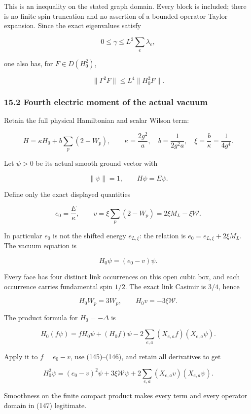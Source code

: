\documentclass[
  11pt,
]{article}
\begin{document}
This is an inequality on the stated graph domain. Every block is
included; there is no finite spin truncation and no assertion of a
bounded-operator Taylor expansion. Since the exact eigenvalues satisfy

\[
 0\le\gamma\le L^2\sum_e\lambda_e,
\]

one also has, for \(F\in D(H_0^2)\),

\[
 \|\Gamma^2F\|\le L^4\|H_0^2F\|.
\tag{144}
\]

\subsubsection{15.2 Fourth electric moment of the actual
vacuum}\label{fourth-electric-moment-of-the-actual-vacuum}

Retain the full physical Hamiltonian and scalar Wilson term:

\[
 H=\kappa H_0+b\sum_p(2-W_p),\qquad
 \kappa=\frac{2g^2}{a},\quad b=\frac1{2g^2a},\quad
 \xi=\frac b\kappa=\frac1{4g^4}.
\]

Let \(\psi>0\) be its actual smooth ground vector with

\[
 \|\psi\|=1,\qquad H\psi=E\psi.
\]

Define only the exact displayed quantities

\[
 e_0=\frac E\kappa,\qquad
 v=\xi\sum_p(2-W_p)=2\xi M_L-\xi\mathcal W.
\]

In particular \(e_0\) is not the shifted energy \(e_{L,\xi}\): the
relation is \(e_0=e_{L,\xi}+2\xi M_L\). The vacuum equation is

\[
 H_0\psi=(e_0-v)\psi.
\tag{145}
\]

Every face has four distinct link occurrences on this open cubic box,
and each occurrence carries fundamental spin \(1/2\). The exact link
Casimir is \(3/4\), hence

\[
 H_0W_p=3W_p,\qquad H_0v=-3\xi\mathcal W.
\tag{146}
\]

The product formula for \(H_0=-\Delta\) is

\[
 H_0(f\psi)=fH_0\psi+(H_0f)\psi
             -2\sum_{e,a}(X_{e,a}f)(X_{e,a}\psi).
\]

Apply it to \(f=e_0-v\), use (145)--(146), and retain all derivatives to
get

\[
 \boxed{H_0^2\psi=(e_0-v)^2\psi
          +3\xi\mathcal W\psi
          +2\sum_{e,a}(X_{e,a}v)(X_{e,a}\psi).}
\tag{147}
\]

Smoothness on the finite compact product makes every term and every
operator domain in (147) legitimate.
\end{document}
